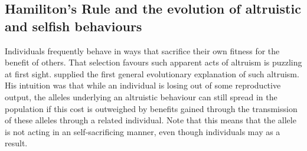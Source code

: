 \subsection{Hamiliton's Rule and the evolution of altruistic and selfish behaviours}
Individuals frequently behave in ways that sacrifice their own fitness for the
benefit of others. That selection favours such apparent acts of altruism is puzzling at first sight. \citet{hamilton1964genetical,hamilton1964genetical2} supplied the first general evolutionary explanation of such altruism. 
His intuition was that while an individual is losing out of some reproductive output, the alleles underlying an altruistic behaviour can still spread in the population if this cost is outweighed by benefits gained 
through the transmission of these alleles through a related individual. Note that this means that the
allele is not acting in an self-sacrificing manner, even though individuals may as a result. 
